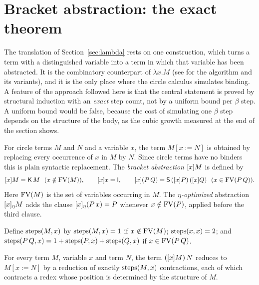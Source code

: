 \section{Bracket abstraction: the exact theorem}\label{sec:abstraction}

The translation of Section~\ref{sec:lambda} rests on one construction, which turns a term with a distinguished variable into a term in which that variable has been abstracted. It is the combinatory counterpart of $\lambda x.M$ (see \cite{curry-feys,turner} for the algorithm and its variants), and it is the only place where the circle calculus simulates binding. A feature of the approach followed here is that the central statement is proved by structural induction with an \emph{exact} step count, not by a uniform bound per $\beta$ step. A uniform bound would be false, because the cost of simulating one $\beta$ step depends on the structure of the body, as the cubic growth measured at the end of the section shows.

\begin{definition}\label{def:abstraction}
For circle terms $M$ and $N$ and a variable $x$, the term $M[x:=N]$ is obtained by replacing every occurrence of $x$ in $M$ by $N$. Since circle terms have no binders this is plain syntactic replacement. The \emph{bracket abstraction} $[x]M$ is defined by
\[
[x]M=\mathsf{K}\,M\ \ (x\notin\mathrm{FV}(M)),
\qquad
[x]x=\mathsf{I},
\qquad
[x](P\,Q)=\mathsf{S}\,([x]P)\,([x]Q)\ \ (x\in\mathrm{FV}(P\,Q)).
\]
Here $\mathrm{FV}(M)$ is the set of variables occurring in $M$. The \emph{$\eta$-optimized} abstraction $[x]_\eta M$ adds the clause $[x]_\eta(P\,x)=P$ whenever $x\notin\mathrm{FV}(P)$, applied before the third clause.
\end{definition}

\begin{definition}\label{def:steps}
Define $\mathrm{steps}(M,x)$ by $\mathrm{steps}(M,x)=1$ if $x\notin\mathrm{FV}(M)$; $\mathrm{steps}(x,x)=2$; and $\mathrm{steps}(P\,Q,x)=1+\mathrm{steps}(P,x)+\mathrm{steps}(Q,x)$ if $x\in\mathrm{FV}(P\,Q)$.
\end{definition}

\begin{theorem}\label{thm:abstraction}
For every term $M$, variable $x$ and term $N$, the term $([x]M)\,N$ reduces to $M[x:=N]$ by a reduction of exactly $\mathrm{steps}(M,x)$ contractions, each of which contracts a redex whose position is determined by the structure of $M$.
\end{theorem}

